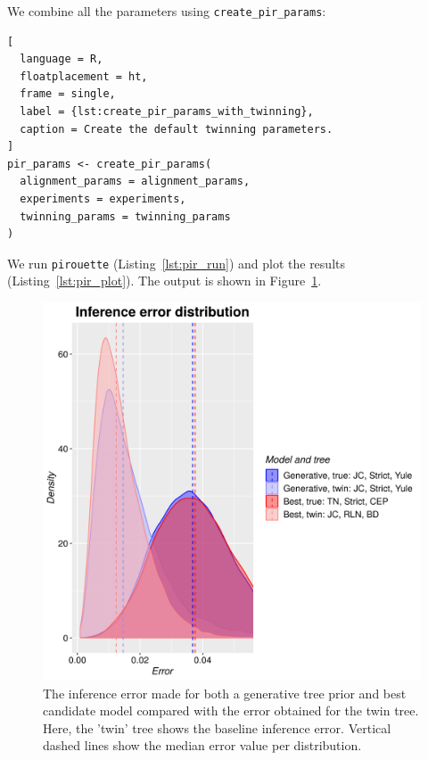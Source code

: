 We combine all the parameters using \verb;create_pir_params;:

\begin{lstlisting}[
  language = R,
  floatplacement = ht,
  frame = single,
  label = {lst:create_pir_params_with_twinning},
  caption = Create the default twinning parameters.
]
pir_params <- create_pir_params(
  alignment_params = alignment_params,
  experiments = experiments,
  twinning_params = twinning_params
)
\end{lstlisting}

We run \verb;pirouette; (Listing~\ref{lst:pir_run}) 
and plot the results (Listing~\ref{lst:pir_plot}).
The output is shown in Figure~\ref{fig:example_3}.

\begin{figure}[H]
  \includegraphics[width=\textwidth]{example_6/errors.png}
  \caption{
    The inference error made 
    for both a generative tree prior and best candidate model
    compared with the error obtained for the twin tree.
    Here, the 'twin' tree shows the baseline inference error.
    Vertical dashed lines show the median error value per distribution.
  }
  \label{fig:example_3}
\end{figure}

